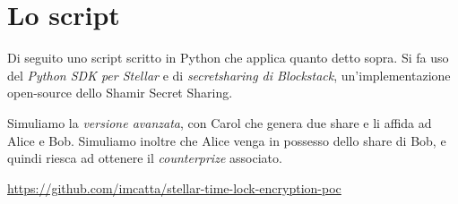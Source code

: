 \section{Lo script}
Di seguito uno script scritto in Python che applica quanto detto sopra.
Si fa uso del \textit{Python SDK per Stellar} e di
\textit{secretsharing di Blockstack}, un'implementazione open-source dello
Shamir Secret Sharing.

Simuliamo la \textit{versione avanzata}, con Carol che genera due share e li
affida ad Alice e Bob.
Simuliamo inoltre che Alice venga in possesso dello share di Bob, e quindi riesca ad
ottenere il \textit{counterprize} associato.

\url{https://github.com/imcatta/stellar-time-lock-encryption-poc}